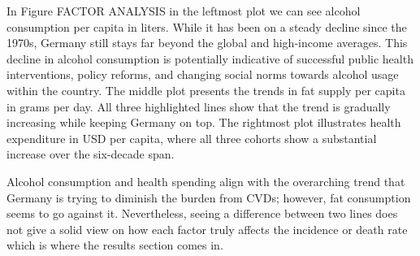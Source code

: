 In Figure FACTOR ANALYSIS in the leftmost plot we can see alcohol consumption per capita in liters. While it has been on a steady decline since the 1970s, Germany still stays far beyond the global and high-income averages. This decline in alcohol consumption is potentially indicative of successful public health interventions, policy reforms, and changing social norms towards alcohol usage within the country. The middle plot presents the trends in fat supply per capita in grams per day. All three highlighted lines show that the trend is gradually increasing while keeping Germany on top. The rightmost plot illustrates health expenditure in USD per capita, where all three cohorts show a substantial increase over the six-decade span.

Alcohol consumption and health spending align with the overarching trend that Germany is trying to diminish the burden from CVDs; however, fat consumption seems to go against it. Nevertheless, seeing a difference between two lines does not give a solid view on how each factor truly affects the incidence or death rate which is where the results section comes in.